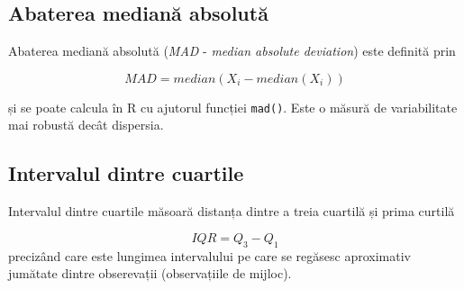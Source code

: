 \documentclass[]{article}
\newenvironment{Shaded}{\begin{snugshade}}{\end{snugshade}}
\newcommand{\KeywordTok}[1]{\textcolor[rgb]{0.13,0.29,0.53}{\textbf{#1}}}
\newcommand{\DataTypeTok}[1]{\textcolor[rgb]{0.13,0.29,0.53}{#1}}
\newcommand{\DecValTok}[1]{\textcolor[rgb]{0.00,0.00,0.81}{#1}}
\newcommand{\FloatTok}[1]{\textcolor[rgb]{0.00,0.00,0.81}{#1}}
\newcommand{\StringTok}[1]{\textcolor[rgb]{0.31,0.60,0.02}{#1}}
\newcommand{\CommentTok}[1]{\textcolor[rgb]{0.56,0.35,0.01}{\textit{#1}}}
\newcommand{\ControlFlowTok}[1]{\textcolor[rgb]{0.13,0.29,0.53}{\textbf{#1}}}
\newcommand{\OperatorTok}[1]{\textcolor[rgb]{0.81,0.36,0.00}{\textbf{#1}}}
\newcommand{\NormalTok}[1]{#1}
\begin{document}
\subsection{Abaterea mediană absolută}\label{abaterea-mediana-absoluta}

Abaterea mediană absolută (\emph{MAD} - \emph{median absolute
deviation}) este definită prin

\[
  MAD = median(X_i - median(X_i))
\]

și se poate calcula în R cu ajutorul funcției \texttt{mad()}. Este o
măsură de variabilitate mai robustă decât dispersia.

\begin{Shaded}
\end{Shaded}

\subsection{Intervalul dintre
cuartile}\label{intervalul-dintre-cuartile}

Intervalul dintre cuartile măsoară distanța dintre a treia cuartilă și
prima curtilă

\[
  IQR = Q_3 - Q_1
\] precizând care este lungimea intervalului pe care se regăsesc
aproximativ jumătate dintre obserevații (observațiile de mijloc).
\end{document}
